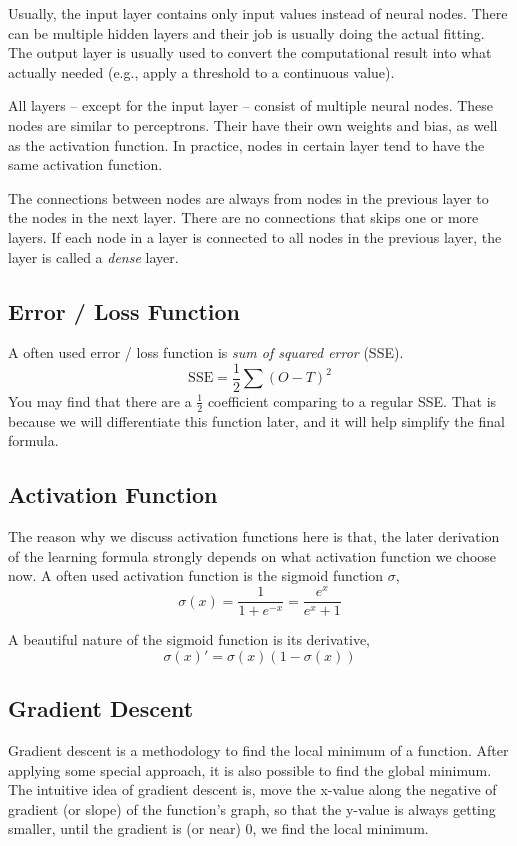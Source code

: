 \documentclass{note}
\begin{document}
Usually, the input layer contains only input values instead of neural nodes. There can be multiple hidden layers and their job is usually doing the actual fitting. The output layer is usually used to convert the computational result into what actually needed (e.g., apply a threshold to a continuous value).

All layers -- except for the input layer -- consist of multiple neural nodes. These nodes are similar to perceptrons. Their have their own weights and bias, as well as the activation function. In practice, nodes in certain layer tend to have the same activation function. 

The connections between nodes are always from nodes in the previous layer to the nodes in the next layer. There are no connections that skips one or more layers. If each node in a layer is connected to all nodes in the previous layer, the layer is called a \textit{dense} layer.

\subsection{Error / Loss Function}

A often used error / loss function is \textit{sum of squared error} (SSE).
$$
\text{SSE} = \frac{1}{2} \sum (O - T)^2
$$
You may find that there are a $\frac{1}{2}$ coefficient comparing to a regular SSE. That is because we will differentiate this function later, and it will help simplify the final formula.

\subsection{Activation Function}

The reason why we discuss activation functions here is that, the later derivation of the learning formula strongly depends on what activation function we choose now. A often used activation function is the sigmoid function $\sigma$, 
$$
\sigma(x) = \frac{1}{1+e^{-x}} = \frac{e^x}{e^x + 1}
$$

A beautiful nature of the sigmoid function is its derivative, 
$$
\sigma(x)' = \sigma(x)(1 - \sigma(x))
$$

\subsection{Gradient Descent}

Gradient descent is a methodology to find the local minimum of a function. After applying some special approach, it is also possible to find the global minimum. The intuitive idea of gradient descent is, move the x-value along the negative of gradient (or slope) of the function's graph, so that the y-value is always getting smaller, until the gradient is (or near) $0$, we find the local minimum.
\end{document}
